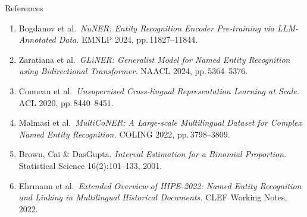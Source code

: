 \documentclass[xcolor,aspectratio=169,compress]{beamer}
\begin{document}
\begin{frame}{References}
  \footnotesize
  \begin{enumerate}\setlength{\itemsep}{4pt}
    \item Bogdanov et al.\ \textit{NuNER: Entity Recognition Encoder Pre-training via LLM-Annotated Data.}
          EMNLP 2024, pp.\,11827--11844.
    \item Zaratiana et al.\ \textit{GLiNER: Generalist Model for Named Entity Recognition using Bidirectional Transformer.}
          NAACL 2024, pp.\,5364--5376.
    \item Conneau et al.\ \textit{Unsupervised Cross-lingual Representation Learning at Scale.}
          ACL 2020, pp.\,8440--8451.
    \item Malmasi et al.\ \textit{MultiCoNER: A Large-scale Multilingual Dataset for Complex Named Entity Recognition.}
          COLING 2022, pp.\,3798--3809.
    \item Brown, Cai \& DasGupta. \textit{Interval Estimation for a Binomial Proportion.}
          Statistical Science 16(2):101--133, 2001.
    \item Ehrmann et al.\ \textit{Extended Overview of HIPE-2022: Named Entity Recognition and Linking
          in Multilingual Historical Documents.} CLEF Working Notes, 2022.
  \end{enumerate}
\end{frame}
\end{document}
